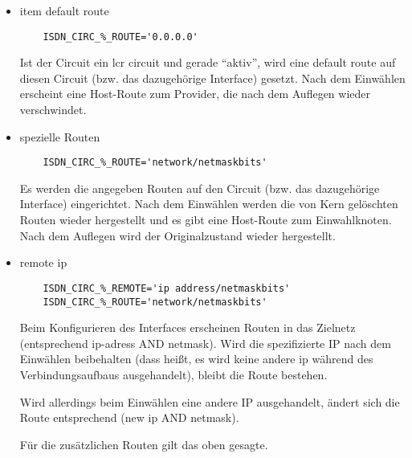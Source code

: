 \begin{itemize}
\item 
  item default route
  \begin{small}
\begin{example}
\begin{verbatim}
    ISDN_CIRC_%_ROUTE='0.0.0.0'
\end{verbatim}
\end{example}
  \end{small}
  
  Ist der Circuit ein lcr circuit und gerade ``aktiv'', wird eine
  default route auf diesen Circuit (bzw. das dazugehörige Interface)
  gesetzt.  Nach dem Einwählen erscheint eine Host-Route zum Provider,
  die nach dem Auflegen wieder verschwindet.


  \item spezielle Routen
  \begin{small}
\begin{example}
\begin{verbatim}
    ISDN_CIRC_%_ROUTE='network/netmaskbits'
\end{verbatim}
\end{example}
  \end{small}
  
  Es werden die angegeben Routen auf den Circuit (bzw. das
  dazugehörige Interface) eingerichtet.  Nach dem Einwählen werden die
  von Kern gelöschten Routen wieder hergestellt und es gibt eine
  Host-Route zum Einwahlknoten. Nach dem Auflegen wird der
  Originalzustand wieder hergestellt.



  \item remote ip
  \begin{small}
\begin{example}
\begin{verbatim}
    ISDN_CIRC_%_REMOTE='ip address/netmaskbits'
    ISDN_CIRC_%_ROUTE='network/netmaskbits'
\end{verbatim}
\end{example}
  \end{small}
  
  Beim Konfigurieren des Interfaces erscheinen Routen in das Zielnetz
  (entsprechend ip-adress AND netmask).  Wird die spezifizierte IP
  nach dem Einwählen beibehalten (dass heißt, es wird keine andere ip
  während des Verbindungsaufbaus ausgehandelt), bleibt die Route
  bestehen.
  
  Wird allerdings beim Einwählen eine andere IP ausgehandelt, ändert
  sich die Route entsprechend (new ip AND netmask).
  
  Für die zusätzlichen Routen gilt das oben gesagte.


\end{itemize}

